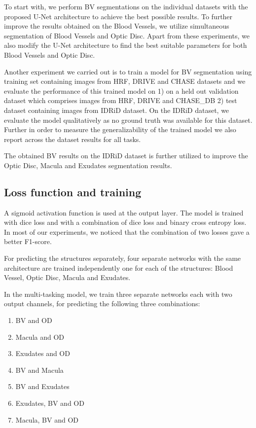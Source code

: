 \documentclass[utf8]{FrontiersinHarvard} %
\begin{document}
To start with, we perform BV segmentations on the individual datasets with the proposed U-Net architecture to achieve the best possible results. To further improve the results obtained on the Blood Vessels, we utilize simultaneous segmentation of Blood Vessels and Optic Disc. Apart from these experiments, we also modify the U-Net architecture to find the best suitable parameters for both Blood Vessels and Optic Disc.

Another experiment we carried out is to train a model for BV segmentation using training set containing images from HRF, DRIVE and CHASE datasets and we evaluate the performance of this trained model on  1) on a held out validation dataset which comprises images from HRF, DRIVE and CHASE\_DB  2) test dataset containing images from IDRiD dataset. On the IDRiD dataset, we evaluate the model qualitatively as no ground truth was available for this dataset. Further in order to measure the generalizability of the trained model we also report across the dataset results for all tasks.

The obtained BV results on the IDRiD dataset is further utilized to improve the Optic Disc, Macula and Exudates segmentation results.

\subsection{Loss function and training}\label{sec:loss_and_training}
A sigmoid activation function is used at the output layer. The model is trained with dice loss and  with a combination of dice loss and binary cross entropy loss. In most of our experiments, we noticed that the combination of two losses gave a better F1-score.

For predicting the structures separately, four separate networks with the same architecture are trained independently one for each of the structures: Blood Vessel, Optic Disc, Macula and Exudates.

In the multi-tasking model, we train three separate networks each with two output channels, for predicting the following three combinations:
\begin{enumerate}
\item BV and OD
\item Macula and OD
\item Exudates and OD
\item BV and Macula
\item BV and Exudates
\item Exudates, BV and OD
\item Macula, BV and OD
\end{enumerate}
\end{document}

